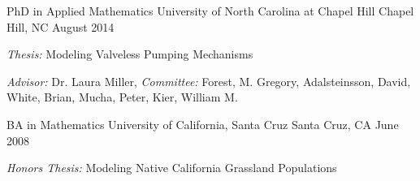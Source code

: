 
\begin{cventries}
  \cventry
    {PhD in Applied Mathematics} %
    {University of North Carolina at Chapel Hill} %
    {Chapel Hill, NC} %
    {August 2014} %
    {
    \begin{cvitems}
     \item{\textit{Thesis:} Modeling Valveless Pumping Mechanisms}
     \item{\textit{Advisor:} Dr. Laura Miller, \textit{Committee:} Forest, M. Gregory, Adalsteinsson, David, White, Brian, Mucha, Peter, Kier, William M.}
     \end{cvitems}
    }

  \cventry
    {BA in Mathematics} %
    {University of California, Santa Cruz} %
    {Santa Cruz, CA} %
    {June 2008} %
    {
    \begin{cvitems}
     \item{\textit{Honors Thesis:} Modeling Native California Grassland Populations}
     \end{cvitems}
    }
    
\end{cventries}
